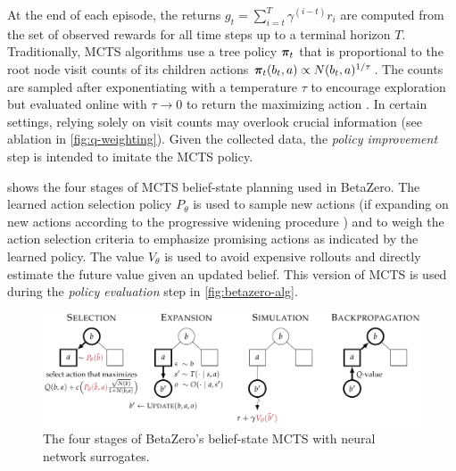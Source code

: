 At the end of each episode, the returns $g_t = \sum_{i=t}^T \gamma^{(i-t)} r_i$ are computed from the set of observed rewards for all time steps up to a terminal horizon $T$.
Traditionally, MCTS algorithms use a tree policy $\boldsymbol\pi_t$ that is proportional to the root node visit counts of its children actions $\boldsymbol\pi_t(b_t, a) \propto N(b_t,a)^{1/\tau}$.
The counts are sampled after exponentiating with a temperature $\tau$ to encourage exploration but evaluated online with $\tau \to 0$ to return the maximizing action \cite{silver2017mastering}.
In certain settings, relying solely on visit counts may overlook crucial information (see ablation in \cref{fig:q-weighting}).
Given the collected data, the \textit{policy improvement} step is intended to imitate the MCTS policy.

 shows the four stages of MCTS belief-state planning used in BetaZero.
The learned action selection policy $P_\theta$ is used to sample new actions (if expanding on new actions according to the progressive widening procedure \cite{couetoux2011continuous}) and to weigh the action selection criteria to emphasize promising actions as indicated by the learned policy.
The value $V_\theta$ is used to avoid expensive rollouts and directly estimate the future value given an updated belief.
This version of MCTS is used during the \textit{policy evaluation} step in \cref{fig:betazero-alg}.

\begin{figure}[t!]
    \centering
    \includegraphics[width=\linewidth]{diagrams/betazero/mcts-betazero.pdf}
    \caption{The four stages of BetaZero's belief-state MCTS with neural network surrogates.}
    \label{fig:mcts-betazero}
\end{figure}

